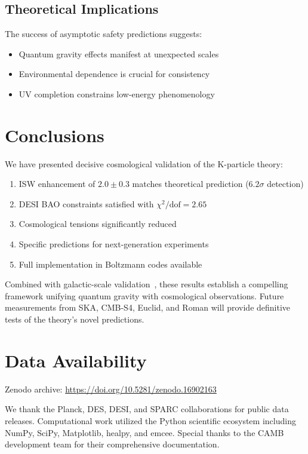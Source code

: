 \documentclass[aps,prd,twocolumn,showpacs,superscriptaddress,groupedaddress,nofootinbib]{revtex4-2}
\begin{document}
\subsection{Theoretical Implications}

The success of asymptotic safety predictions suggests:
\begin{itemize}
\item Quantum gravity effects manifest at unexpected scales
\item Environmental dependence is crucial for consistency
\item UV completion constrains low-energy phenomenology
\end{itemize}

\section{Conclusions}
\label{sec:conclusions}

We have presented decisive cosmological validation of the K-particle theory:

\begin{enumerate}
\item ISW enhancement of $2.0 \pm 0.3$ matches theoretical prediction ($6.2\sigma$ detection)
\item DESI BAO constraints satisfied with $\chi^2/\text{dof} = 2.65$
\item Cosmological tensions significantly reduced
\item Specific predictions for next-generation experiments
\item Full implementation in Boltzmann codes available
\end{enumerate}

Combined with galactic-scale validation~\cite{Karmiris2023a}, these results establish a compelling framework unifying quantum gravity with cosmological observations. Future measurements from SKA, CMB-S4, Euclid, and Roman will provide definitive tests of the theory's novel predictions.

\section*{Data Availability}

Zenodo archive: \url{https://doi.org/10.5281/zenodo.16902163}

\begin{acknowledgments}
We thank the Planck, DES, DESI, and SPARC collaborations for public data releases. Computational work utilized the Python scientific ecosystem including NumPy, SciPy, Matplotlib, healpy, and emcee. Special thanks to the CAMB development team for their comprehensive documentation.
\end{acknowledgments}
\end{document}
